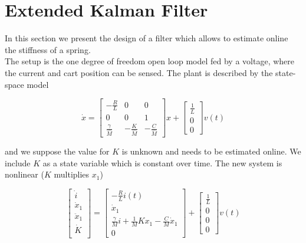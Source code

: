 \section{Extended Kalman Filter}
In this section we present the design of a filter which allows to estimate online the stiffness of a spring.\\

The setup is the one degree of freedom open loop model fed by a voltage, where the current and cart position can be sensed. The plant is described by the state-space model

\begin{equation}
	\dot{x}=\begin{bmatrix}
		-\frac{R}{L} &0 & 0 \\
		0 & 0 & 1 \\ 
		\frac{\gamma}{\hat{M}} & -\frac{K}{\hat{M}} & -\frac{C}{\hat{M}}
	\end{bmatrix}
	x
	+
	\begin{bmatrix}\frac{1}{L} \\ 0 \\ 0\end{bmatrix} v(t)
\end{equation}

and we suppose the value for $K$ is unknown and needs to be estimated online. We include $K$ as a state variable which is constant over time. The new system is nonlinear ($K$ multiplies $x_1$)

\begin{equation}
		\begin{bmatrix}
			\dot{i} \\
			\dot{x}_1 \\
			\ddot{x}_1 \\
			\dot{K} \\
		\end{bmatrix}
		= 
		\begin{bmatrix}
			-\frac{R}{L} i(t) \\
			\dot{x}_1 \\
			\frac{\gamma}{M} i + \frac{1}{M} Kx_1 - \frac{C}{M} \dot{x}_1 \\
			0
		\end{bmatrix}
		+
		\begin{bmatrix}\frac{1}{L} \\ 0 \\ 0 \\ 0 \end{bmatrix} v(t)
\end{equation}

